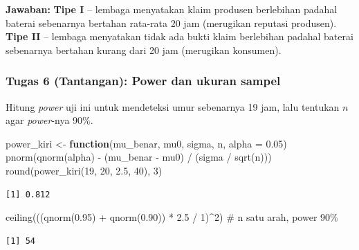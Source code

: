 \documentclass[
  indonesian,
  letterpaper,
]{book}
\newenvironment{Shaded}{\begin{snugshade}}{\end{snugshade}}
\newcommand{\AttributeTok}[1]{\textcolor[rgb]{0.40,0.45,0.13}{#1}}
\newcommand{\CommentTok}[1]{\textcolor[rgb]{0.37,0.37,0.37}{#1}}
\newcommand{\ControlFlowTok}[1]{\textcolor[rgb]{0.00,0.23,0.31}{\textbf{#1}}}
\newcommand{\DecValTok}[1]{\textcolor[rgb]{0.68,0.00,0.00}{#1}}
\newcommand{\FloatTok}[1]{\textcolor[rgb]{0.68,0.00,0.00}{#1}}
\newcommand{\FunctionTok}[1]{\textcolor[rgb]{0.28,0.35,0.67}{#1}}
\newcommand{\NormalTok}[1]{\textcolor[rgb]{0.00,0.23,0.31}{#1}}
\newcommand{\OtherTok}[1]{\textcolor[rgb]{0.00,0.23,0.31}{#1}}
\newcommand{\SpecialCharTok}[1]{\textcolor[rgb]{0.37,0.37,0.37}{#1}}
\begin{document}
\textbf{Jawaban:} \textbf{Tipe I} -- lembaga menyatakan klaim produsen
berlebihan padahal baterai sebenarnya bertahan rata-rata 20 jam
(merugikan reputasi produsen). \textbf{Tipe II} -- lembaga menyatakan
tidak ada bukti klaim berlebihan padahal baterai sebenarnya bertahan
kurang dari 20 jam (merugikan konsumen).

\subsubsection{Tugas 6 (Tantangan): Power dan ukuran
sampel}\label{tugas-6-tantangan-power-dan-ukuran-sampel}

Hitung \emph{power} uji ini untuk mendeteksi umur sebenarnya 19 jam,
lalu tentukan \(n\) agar \emph{power}-nya 90\%.

\begin{Shaded}
\begin{Highlighting}[]
\NormalTok{power\_kiri }\OtherTok{\textless{}{-}} \ControlFlowTok{function}\NormalTok{(mu\_benar, mu0, sigma, n, }\AttributeTok{alpha =} \FloatTok{0.05}\NormalTok{)}
  \FunctionTok{pnorm}\NormalTok{(}\FunctionTok{qnorm}\NormalTok{(alpha) }\SpecialCharTok{{-}}\NormalTok{ (mu\_benar }\SpecialCharTok{{-}}\NormalTok{ mu0) }\SpecialCharTok{/}\NormalTok{ (sigma }\SpecialCharTok{/} \FunctionTok{sqrt}\NormalTok{(n)))}
\FunctionTok{round}\NormalTok{(}\FunctionTok{power\_kiri}\NormalTok{(}\DecValTok{19}\NormalTok{, }\DecValTok{20}\NormalTok{, }\FloatTok{2.5}\NormalTok{, }\DecValTok{40}\NormalTok{), }\DecValTok{3}\NormalTok{)}
\end{Highlighting}
\end{Shaded}

\begin{verbatim}
[1] 0.812
\end{verbatim}

\begin{Shaded}
\begin{Highlighting}[]
\FunctionTok{ceiling}\NormalTok{(((}\FunctionTok{qnorm}\NormalTok{(}\FloatTok{0.95}\NormalTok{) }\SpecialCharTok{+} \FunctionTok{qnorm}\NormalTok{(}\FloatTok{0.90}\NormalTok{)) }\SpecialCharTok{*} \FloatTok{2.5} \SpecialCharTok{/} \DecValTok{1}\NormalTok{)}\SpecialCharTok{\^{}}\DecValTok{2}\NormalTok{)   }\CommentTok{\# n satu arah, power 90\%}
\end{Highlighting}
\end{Shaded}

\begin{verbatim}
[1] 54
\end{verbatim}
\end{document}
